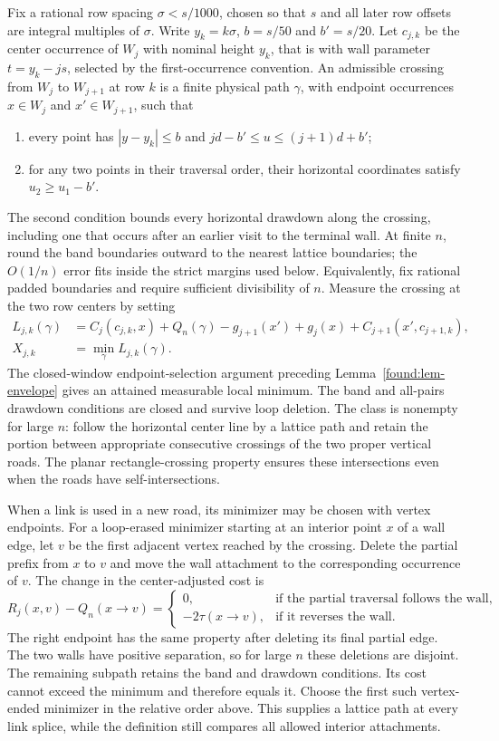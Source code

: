 Fix a rational row spacing $\sigma<s/1000$, chosen so that $s$ and
all later row offsets are integral multiples of $\sigma$.  Write
$y_k=k\sigma$, $b=s/50$ and $b'=s/20$.  Let $c_{j,k}$ be the
center occurrence of $W_j$ with nominal height $y_k$, that is with
wall parameter $t=y_k-js$, selected by the first-occurrence convention.
An admissible crossing from $W_j$ to $W_{j+1}$ at row $k$ is a finite
physical path $\gamma$, with endpoint occurrences $x\in W_j$ and
$x'\in W_{j+1}$, such that
\begin{enumerate}
\item every point has $|y-y_k|\le b$ and
$jd-b'\le u\le(j+1)d+b'$;
\item for any two points in their traversal order, their horizontal
coordinates satisfy $u_2\ge u_1-b'$.
\end{enumerate}
The second condition bounds every horizontal drawdown along the
crossing, including one that occurs after an earlier visit to the
terminal wall.  At finite $n$, round the band boundaries outward to
the nearest lattice boundaries; the $O(1/n)$ error fits inside the
strict margins used below.  Equivalently, fix rational padded
boundaries and require sufficient divisibility of $n$.
Measure the crossing at the two row centers by setting
\begin{align}
 L_{j,k}(\gamma)
  &=C_j(c_{j,k},x)
    +Q_n(\gamma)-g_{j+1}(x')+g_j(x)
    +C_{j+1}(x',c_{j+1,k}), \\
 X_{j,k}&=\min_\gamma L_{j,k}(\gamma).
 \label{links:definition}
\end{align}
The closed-window endpoint-selection argument preceding
Lemma~\ref{found:lem-envelope} gives an attained measurable local
minimum. The band and all-pairs drawdown conditions are closed and
survive loop deletion. The class is nonempty for large $n$: follow the horizontal center line by a
lattice path and retain the portion between appropriate consecutive
crossings of the two proper vertical roads.  The planar
rectangle-crossing property ensures these intersections even when
the roads have self-intersections.

When a link is used in a new road, its minimizer may be chosen with
vertex endpoints. For a loop-erased minimizer starting at an interior
point $x$ of a wall edge, let $v$ be the first adjacent vertex reached
by the crossing. Delete the partial prefix from $x$ to $v$ and move
the wall attachment to the corresponding occurrence of $v$. The change
in the center-adjusted cost is
\[
 R_j(x,v)-Q_n(x\mathbin{\to}v)
 =\begin{cases}
 0,&\text{if the partial traversal follows the wall},\\
 -2\tau(x\mathbin{\to}v),&\text{if it reverses the wall}.
 \end{cases}
\]
The right endpoint has the same property after deleting its final
partial edge. The two walls have positive separation, so for large
$n$ these deletions are disjoint. The remaining subpath retains the
band and drawdown conditions. Its cost cannot exceed the minimum and
therefore equals it. Choose the first such vertex-ended minimizer in
the relative order above. This supplies a lattice path at every link
splice, while the definition still compares all allowed interior
attachments.

